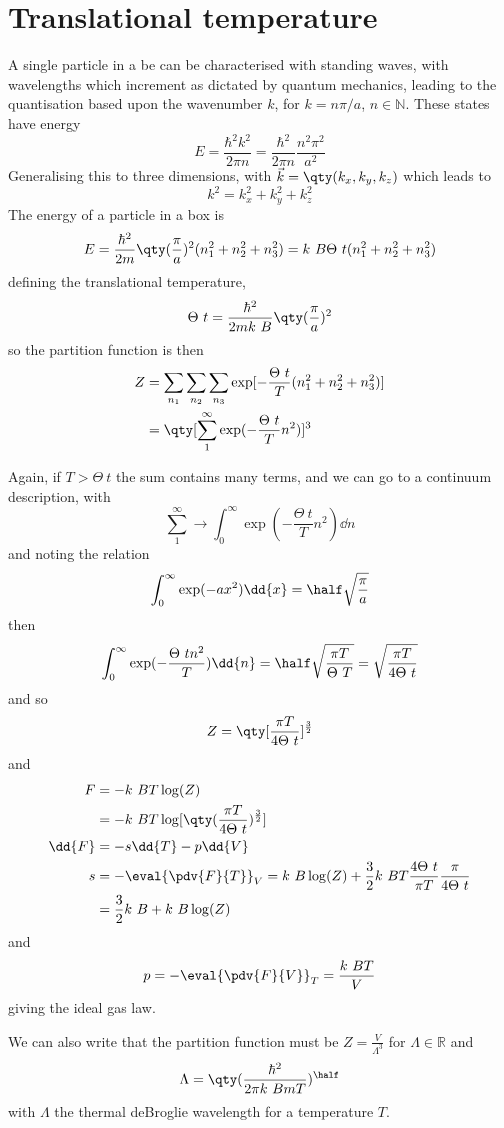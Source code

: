 \section{Translational temperature}
\label{sec:transl-temp}

A single particle in a be can be characterised with standing waves,
with wavelengths which increment as dictated by quantum mechanics,
leading to the quantisation based upon the wavenumber $k$, for $k = n
\pi/a$, $n \in \mathbb{N}$. These states have energy
\[ E = \frac{\hbar^2 k^2}{2 \pi n} = \frac{\hbar^2}{2 \pi n} \frac{n^2
  \pi^2}{a^2} \] Generalising this to three dimensions, with $\vec{k}
= \qty( k_x, k_y, k_z)$ which leads to
\[ k^2 = k_x^2 + k_y^2 + k_z^2 \]
The energy of a particle in a box is
\[ E = \frac{\hbar^2}{2 m} \qty( \frac{\pi}{a})^2 (n_1^2 + n_2^2 +
n_3^2) = k~B \Theta~t (n_1^2 + n_2^2 + n_3^2) \] defining the
translational temperature,
\begin{equation}
  \label{eq:30}
  \Theta~t = \frac{\hbar^2}{2 m k~B} \qty( \frac{\pi}{a})^2
\end{equation}
so the partition function is then
\begin{align}
  \label{eq:31}
  Z &= \sum_{n_1} \sum_{n_2} \sum_{n_3} \exp[ - \frac{\Theta~t}{T}  (n_1^2 + n_2^2 + n_3^2) ] \nonumber\\
&= \qty[ \sum_1^{\infty} \exp( - \frac{\Theta~t}{T} n^2 )]^3
\end{align}

Again, if $T > \Theta~t$ the sum contains many terms, and we can go to
a continuum description, with
\[ \sum_1^{\infty} \to \int_0^{\infty} \exp(- \frac{\Theta~t}{T} n^2 ) \dd{n} \]
and noting the relation
\[ \int_0^{\infty} \exp(-a x^2) \dd{x} = \half \sqrt{\frac{\pi}{a}} \]
then
\[ \int_0^{\infty} \exp(- \frac{\Theta~t n^2}{T} ) \dd{n} = \half \sqrt{\frac{\pi T}{\Theta~T}} = \sqrt{\frac{\pi T}{4 \Theta~t}} \] and so
\[ Z = \qty[\frac{\pi T}{4 \Theta~t}]^{\frac{3}{2}} \]
and
\begin{align*}
  F &= - k~B T \log(Z) \\ &= - k~B T \log[ \qty( \frac{\pi T}{4 \Theta~t})^{\frac{3}{2}}] \\
\dd{F} &= - s \dd{T} - p \dd{V} \\
s &= - \eval{\pdv{F}{T}}_V = k~B \log(Z) + \frac{3}{2} k~B T \frac{4 \Theta~t}{\pi T} \frac{\pi}{4 \Theta~t} \\ &= \frac{3}{2} k~B + k~B \log(Z)
\end{align*} 
and \[ p = - \eval{ \pdv{F}{V}}_T = \frac{k~B T}{V} \]
giving the ideal gas law. 

We can also write that the partition function must be $Z =
\frac{V}{\Lambda^3}$ for $\Lambda \in \mathbb{R}$ and
\[ \Lambda = \qty( \frac{\hbar^2}{2 \pi k~B m T} )^{\half} \] with
$\Lambda$ the thermal deBroglie wavelength for a temperature $T$.
